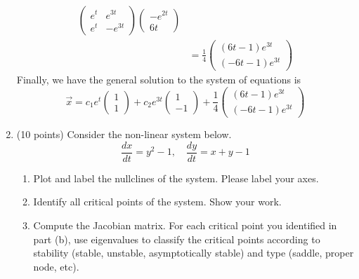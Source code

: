 \documentclass[11pt, titlepage]{article}
\begin{document}
\begin{enumerate}
\begin{solution}
\begin{align*}
\begin{pmatrix}
                    e^t & e^{3t} \\
                    e^t & -e^{3t}
                \end{pmatrix}
                \begin{pmatrix}
                    -e^{2t} \\
                    6t
                \end{pmatrix} \\
                &= \frac{1}{4}
                \begin{pmatrix}
                    (6t - 1) e^{3t} \\
                    (-6t - 1) e^{3t}
                \end{pmatrix}
            \end{align*}
            Finally, we have the general solution to the system of equations is
            \[
            \vec{x} = c_1 e^t
            \begin{pmatrix}
                1 \\
                1
            \end{pmatrix}
            + c_2 e^{3t}
            \begin{pmatrix}
                1 \\
                -1
            \end{pmatrix}
            + \frac{1}{4}
            \begin{pmatrix}
                (6t - 1) e^{3t} \\
                (-6t - 1) e^{3t}
            \end{pmatrix}
            \]
        \end{solution}

        \pagebreak

        \item (10 points) Consider the non-linear system below.
        \[
        \frac{dx}{dt} = y^2 - 1, \quad \frac{dy}{dt} = x + y - 1
        \]

        \begin{enumerate}[label={(\alph*)}]
            \item Plot and label the nullclines of the system. Please label your axes.

            \item Identify all critical points of the system. Show your work.

            \item Compute the Jacobian matrix.
            For each critical point you identified in part (b), use eigenvalues to classify the critical points according to stability (stable, unstable, asymptotically stable) and type (saddle, proper node, etc).
        \end{enumerate}


\end{enumerate}
\end{document}
